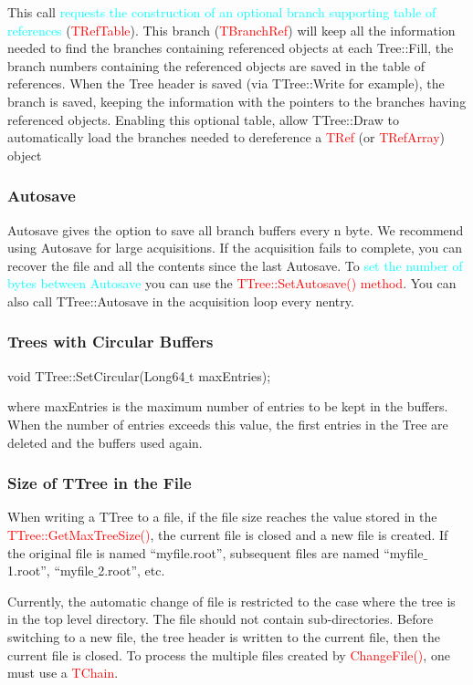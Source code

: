 \documentclass[12pt,a4paper]{article}
\begin{document}
This call \textcolor{cyan}{requests the construction of an optional branch supporting table of references} (\textcolor{red}{TRefTable}). This branch (\textcolor{red}{TBranchRef}) will keep all the information needed to find the branches containing referenced objects at each Tree::Fill, the branch numbers containing the referenced objects are saved in the table of references. When the Tree header is saved (via TTree::Write for example), the branch is saved, keeping the information with the pointers to the branches having referenced objects. Enabling this optional table, allow TTree::Draw to automatically load the branches needed to dereference a \textcolor{red}{TRef} (or \textcolor{red}{TRefArray}) object

\subsubsection{Autosave}
Autosave gives the option to save all branch buffers every n byte. We recommend using Autosave for large acquisitions. If the acquisition fails to complete, you can recover the file and all the contents since the last Autosave. To \textcolor{cyan}{set the number of bytes between Autosave} you can use the \textcolor{red}{TTree::SetAutosave() method}. You can also call TTree::Autosave in the acquisition loop every nentry.

\subsubsection{Trees with Circular Buffers}
void TTree::SetCircular(Long64$\_$t maxEntries);

where maxEntries is the maximum number of entries to be kept in the buffers. When the number of entries exceeds this value, the first entries in the Tree are deleted and the buffers used again.

\subsubsection{Size of TTree in the File}
When writing a TTree to a file, if the file size reaches the value stored in the \textcolor{red}{TTree::GetMaxTreeSize()}, the current file is closed and a new file is created. If the original file is named ``myfile.root”, subsequent files are named
``myfile$\_$1.root”, ``myfile$\_$2.root”, etc.

Currently, the automatic change of file is restricted to the case where the tree is in the top level directory. The file should not contain sub-directories. Before switching to a new file, the tree header is written to the current file, then the current file is closed. To process the multiple files created by \textcolor{red}{ChangeFile()}, one must use a \textcolor{red}{TChain}.
\end{document}
